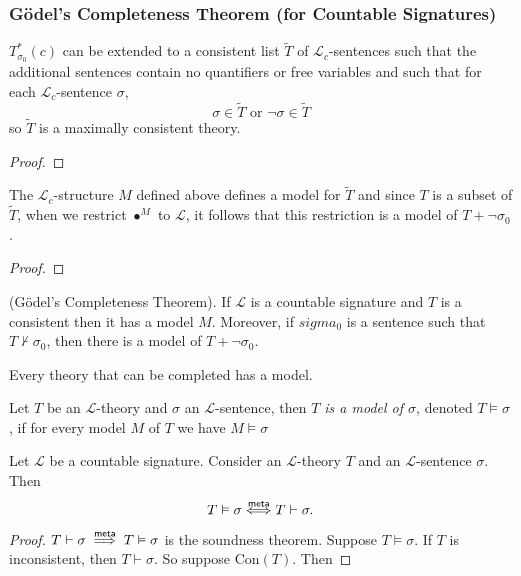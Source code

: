\subsubsection{Gödel's Completeness Theorem (for Countable Signatures)}
\begin{lemma}
    $T^\ast_{\sigma_0}(c)$ can be extended to a consistent list $\widetilde{T}$ of $\mathcal{L}_c$-sentences such that the additional sentences contain no quantifiers or free variables and such that for each $\mathcal{L}_c$-sentence $\sigma$,
    $$\sigma\in \widetilde{T} \text{ or } \neg\sigma\in \widetilde{T}$$
    so $\widetilde{T}$ is a maximally consistent theory.
\end{lemma}
\begin{proof}
    
\end{proof}
\begin{theorem}
    The $\mathcal{L}_c$-structure $M$ defined above defines a model for $\widetilde{T}$ and since $T$ is a subset of $\widetilde{T}$, when we restrict $\bullet^M$ to $\mathcal{L}$, it follows that this restriction is a model of $T+\neg\sigma_0$. 
\end{theorem}
\begin{proof}

\end{proof}
\begin{theorem}(Gödel's Completeness Theorem). If $\mathcal{L}$ is a countable signature and $T$ is a consistent then it has a model $M$.  
Moreover, if $sigma_0$ is a sentence such that $T\not\vdash \sigma_0$, then there is a model of $T+\neg \sigma_0$.  
\end{theorem}
\begin{corollary}
    Every theory that can be completed has a model.
\end{corollary}
\begin{definition}
    Let $T$ be an $\mathcal{L}$-theory and $\sigma$ an $\mathcal{L}$-sentence, then \emph{$T$ is a model of $\sigma$}, denoted $T\vDash \sigma$, if for every model $M$ of $T$ we have $M\vDash \sigma$
\end{definition}
\begin{corollary}
    Let $\mathcal{L}$ be a countable signature. Consider an $\mathcal{L}$-theory $T$ and an $\mathcal{L}$-sentence $\sigma$. Then 
    $$T\vDash \sigma \mathrel{\overset{\mathsf{meta}}{\Longleftrightarrow}} T\vdash \sigma.$$
\end{corollary}
\begin{proof}
    $T\vdash \sigma\mathrel{\overset{\mathsf{meta}}{\implies}} T\vDash \sigma$ is the soundness theorem. Suppose $T\vDash \sigma$. If $T$ is inconsistent, then $T\vdash \sigma$. So suppose $\mathrm{Con}(T)$. Then 
\end{proof}
